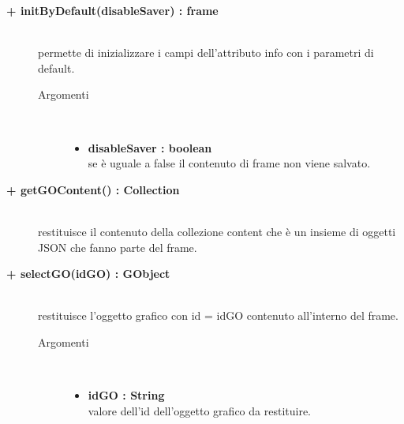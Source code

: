 \begin{description}
\begin{description}
		\item[\textbf{+ initByDefault(disableSaver) : frame			}] \hfill \\
			permette di inizializzare i campi dell'attributo info con i parametri di default. 

\begin{description}
			\item[Argomenti] \hfill \\
				\begin{itemize}
						\item \textbf{disableSaver : boolean			} \hfill \\
					se è uguale a false il contenuto di frame non viene salvato. %
				\end{itemize}

\end{description}

\end{description}

\begin{description}
		\item[\textbf{+ getGOContent() : Collection			}] \hfill \\
			restituisce il contenuto della collezione content che è un insieme di oggetti JSON che fanno parte del frame.
\end{description}

\begin{description}
		\item[\textbf{+ selectGO(idGO) : GObject			}] \hfill \\
			restituisce l'oggetto grafico con id = idGO contenuto all'interno del frame. 

\begin{description}
			\item[Argomenti] \hfill \\
				\begin{itemize}
						\item \textbf{idGO : String			} \hfill \\
					valore dell'id dell'oggetto grafico da restituire.  				
				\end{itemize}

\end{description}

\end{description}


\end{description}
